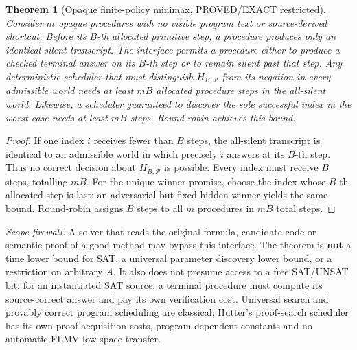 \documentclass[10pt]{article}
\newtheorem{theorem}{Theorem}
\begin{document}
\begin{theorem}[Opaque finite-policy minimax, PROVED/EXACT restricted]\label{thm:opaque}
Consider $m$ opaque procedures with no visible program text or source-derived shortcut. Before its $B$-th allocated primitive step, a procedure produces only an identical silent transcript. The interface permits a procedure either to produce a checked terminal answer on its $B$-th step or to remain silent past that step. Any deterministic scheduler that must distinguish $H_{B,\mathcal P}$ from its negation in every admissible world needs at least $mB$ allocated procedure steps in the all-silent world. Likewise, a scheduler guaranteed to discover the sole successful index in the worst case needs at least $mB$ steps. Round-robin achieves this bound.
\end{theorem}
\begin{proof}
If one index $i$ receives fewer than $B$ steps, the all-silent transcript is identical to an admissible world in which precisely $i$ answers at its $B$-th step. Thus no correct decision about $H_{B,\mathcal P}$ is possible. Every index must receive $B$ steps, totalling $mB$. For the unique-winner promise, choose the index whose $B$-th allocated step is last; an adversarial but fixed hidden winner yields the same bound. Round-robin assigns $B$ steps to all $m$ procedures in $mB$ total steps.
\end{proof}
\noindent\emph{Scope firewall.} A solver that reads the original formula, candidate code or semantic proof of a good method may bypass this interface. The theorem is \textbf{not} a time lower bound for SAT, a universal parameter discovery lower bound, or a restriction on arbitrary $A$. It also does not presume access to a free SAT/UNSAT bit: for an instantiated SAT source, a terminal procedure must compute its source-correct answer and pay its own verification cost. Universal search and provably correct program scheduling are classical; Hutter's proof-search scheduler has its own proof-acquisition costs, program-dependent constants and no automatic FLMV low-space transfer.
\end{document}
